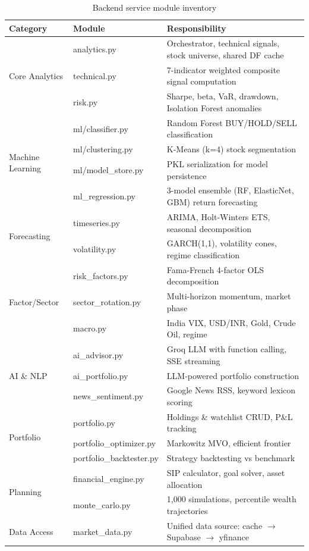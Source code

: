 \documentclass[12pt, a4paper, oneside]{report}
\begin{document}
\begin{table}[H]
\centering
\caption{Backend service module inventory}
\label{tab:service_modules}
\begin{tabularx}{\textwidth}{@{}l l X@{}}
\toprule
\textbf{Category} & \textbf{Module} & \textbf{Responsibility} \\
\midrule
\multirow{3}{*}{Core Analytics} & analytics.py & Orchestrator, technical signals, stock universe, shared DF cache \\
& technical.py & 7-indicator weighted composite signal computation \\
& risk.py & Sharpe, beta, VaR, drawdown, Isolation Forest anomalies \\
\midrule
\multirow{4}{*}{Machine Learning} & ml/classifier.py & Random Forest BUY/HOLD/SELL classification \\
& ml/clustering.py & K-Means (k=4) stock segmentation \\
& ml/model\_store.py & PKL serialization for model persistence \\
& ml\_regression.py & 3-model ensemble (RF, ElasticNet, GBM) return forecasting \\
\midrule
\multirow{2}{*}{Forecasting} & timeseries.py & ARIMA, Holt-Winters ETS, seasonal decomposition \\
& volatility.py & GARCH(1,1), volatility cones, regime classification \\
\midrule
\multirow{3}{*}{Factor/Sector} & risk\_factors.py & Fama-French 4-factor OLS decomposition \\
& sector\_rotation.py & Multi-horizon momentum, market phase \\
& macro.py & India VIX, USD/INR, Gold, Crude Oil, regime \\
\midrule
\multirow{3}{*}{AI \& NLP} & ai\_advisor.py & Groq LLM with function calling, SSE streaming \\
& ai\_portfolio.py & LLM-powered portfolio construction \\
& news\_sentiment.py & Google News RSS, keyword lexicon scoring \\
\midrule
\multirow{3}{*}{Portfolio} & portfolio.py & Holdings \& watchlist CRUD, P\&L tracking \\
& portfolio\_optimizer.py & Markowitz MVO, efficient frontier \\
& portfolio\_backtester.py & Strategy backtesting vs benchmark \\
\midrule
\multirow{2}{*}{Planning} & financial\_engine.py & SIP calculator, goal solver, asset allocation \\
& monte\_carlo.py & 1,000 simulations, percentile wealth trajectories \\
\midrule
Data Access & market\_data.py & Unified data source: cache $\to$ Supabase $\to$ yfinance \\
\bottomrule
\end{tabularx}
\end{table}
\end{document}
